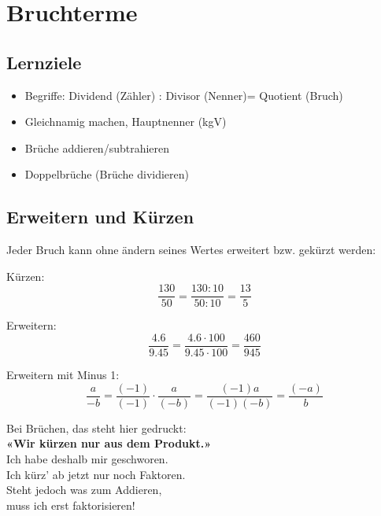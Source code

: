 \newpage
\section{Bruchterme}

\subsection*{Lernziele}

\begin{itemize}
	\item Begriffe: Dividend (Zähler) : Divisor (Nenner)= Quotient (Bruch)
	\item Gleichnamig machen, Hauptnenner (kgV)
	\item Brüche addieren/subtrahieren
	\item Doppelbrüche (Brüche dividieren) 
\end{itemize}

\newpage

\subsection{Erweitern und Kürzen}
Jeder Bruch kann ohne ändern seines Wertes erweitert bzw. gekürzt
werden:

Kürzen:
$$\frac{130}{50} = \frac{130 : 10}{50:10} =\frac{13}{5}$$

Erweitern:
$$\frac{4.6}{9.45} = \frac{4.6 \cdot{}100}{9.45\cdot{}100} =
\frac{460}{945}$$

Erweitern mit Minus 1:
$$\frac{a}{-b}
=\frac{(-1)}{(-1)} \cdot{}\frac{a}{(-b)}
= \frac{(-1)a}{(-1)(-b)}
= \frac{(-a)}{b}$$

\begin{rezept}{}{}

\begin{center}Bei Brüchen, das steht hier gedruckt:\\
\textbf{«Wir kürzen nur aus dem Produkt.»}\\

Ich habe deshalb mir geschworen.\\
Ich kürz' ab jetzt nur noch Faktoren.\\

Steht jedoch was zum Addieren,\\
muss ich erst faktorisieren!\\
\end{center}
\end{rezept}


